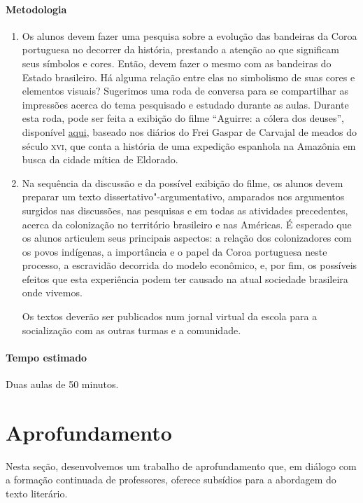 \documentclass[12pt]{extarticle}
\begin{document}
\paragraph{Metodologia}
\begin{enumerate}
\item 
Os alunos devem fazer uma pesquisa sobre a evolução das bandeiras da Coroa
portuguesa no decorrer da história, prestando a atenção ao que significam
seus símbolos e cores. Então, devem fazer o mesmo com as bandeiras do 
Estado brasileiro. Há alguma relação entre elas no simbolismo de suas
cores e elementos visuais? Sugerimos uma roda de conversa para se 
compartilhar as impressões acerca do tema pesquisado e estudado durante
as aulas. Durante esta roda, pode ser feita a exibição do filme ``Aguirre: 
a cólera dos deuses'', disponível \href{https://www.youtube.com/watch?v=weuYp-XFxAo}{aqui}, baseado nos diários do Frei Gaspar de Carvajal 
de meados do século \textsc{xvi}, que conta a história de uma expedição 
espanhola na Amazônia em busca da cidade mítica de Eldorado.

\item 
Na sequência da discussão e da possível exibição do filme, os alunos devem 
preparar um texto dissertativo"-argumentativo, amparados nos argumentos 
surgidos nas discussões, nas pesquisas e em todas as atividades 
precedentes, acerca da colonização no território brasileiro e nas Américas. 
É esperado que os alunos articulem seus principais aspectos:
a relação dos colonizadores com os povos indígenas, a importância e o papel
da Coroa portuguesa neste processo, a escravidão decorrida do modelo 
econômico, e, por fim, os possíveis efeitos que esta experiência podem 
ter causado na atual sociedade brasileira onde vivemos.

Os textos deverão ser publicados num jornal virtual da escola para a 
socialização com as outras turmas e a comunidade.

\end{enumerate}

\paragraph{Tempo estimado} Duas aulas de 50 minutos.


\section{Aprofundamento}


Nesta seção, desenvolvemos um trabalho de aprofundamento que, em diálogo
com a formação continuada de professores, oferece subsídios para a
abordagem do texto literário.
\end{document}
